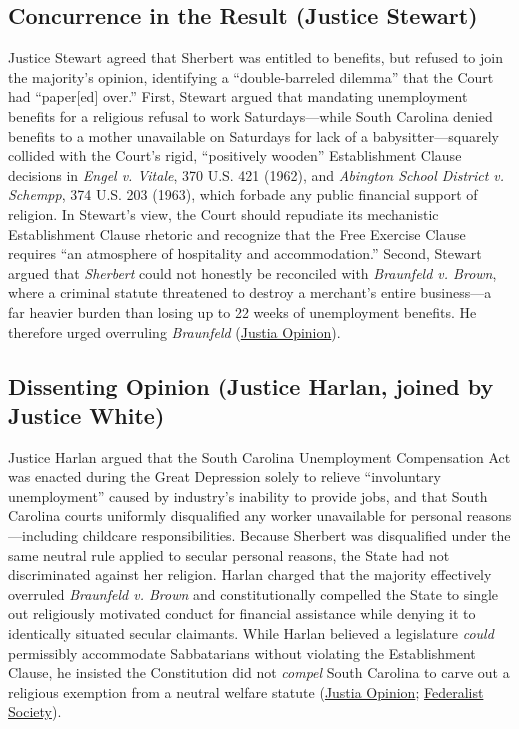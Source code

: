 \documentclass[12pt]{article}
\begin{document}
\subsection{Concurrence in the Result (Justice Stewart)}

Justice Stewart agreed that Sherbert was entitled to benefits, but refused to join the majority's opinion, identifying a ``double-barreled dilemma'' that the Court had ``paper[ed] over.'' First, Stewart argued that mandating unemployment benefits for a religious refusal to work Saturdays---while South Carolina denied benefits to a mother unavailable on Saturdays for lack of a babysitter---squarely collided with the Court's rigid, ``positively wooden'' Establishment Clause decisions in \textit{Engel v. Vitale}, 370 U.S. 421 (1962), and \textit{Abington School District v. Schempp}, 374 U.S. 203 (1963), which forbade any public financial support of religion. In Stewart's view, the Court should repudiate its mechanistic Establishment Clause rhetoric and recognize that the Free Exercise Clause requires ``an atmosphere of hospitality and accommodation.'' Second, Stewart argued that \textit{Sherbert} could not honestly be reconciled with \textit{Braunfeld v. Brown}, where a criminal statute threatened to destroy a merchant's entire business---a far heavier burden than losing up to 22 weeks of unemployment benefits. He therefore urged overruling \textit{Braunfeld} (\href{https://supreme.justia.com/cases/federal/us/374/398/}{Justia Opinion}).

\subsection{Dissenting Opinion (Justice Harlan, joined by Justice White)}

Justice Harlan argued that the South Carolina Unemployment Compensation Act was enacted during the Great Depression solely to relieve ``involuntary unemployment'' caused by industry's inability to provide jobs, and that South Carolina courts uniformly disqualified any worker unavailable for personal reasons---including childcare responsibilities. Because Sherbert was disqualified under the same neutral rule applied to secular personal reasons, the State had not discriminated against her religion. Harlan charged that the majority effectively overruled \textit{Braunfeld v. Brown} and constitutionally compelled the State to single out religiously motivated conduct for financial assistance while denying it to identically situated secular claimants. While Harlan believed a legislature \textit{could} permissibly accommodate Sabbatarians without violating the Establishment Clause, he insisted the Constitution did not \textit{compel} South Carolina to carve out a religious exemption from a neutral welfare statute (\href{https://supreme.justia.com/cases/federal/us/374/398/}{Justia Opinion}; \href{https://fedsoc.org/case/sherbert-v-verner}{Federalist Society}).
\end{document}
